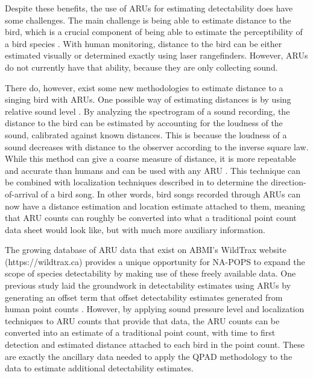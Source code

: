 \par Despite these benefits, the use of ARUs for estimating detectability does have some challenges. 
The main challenge is being able to estimate distance to the bird, which is a crucial component of being able to estimate the perceptibility of a bird species \citep{buckland_distance_2015}.
With human monitoring, distance to the bird can be either estimated visually or determined exactly using laser rangefinders.
However, ARUs do not currently have that ability, because they are only collecting sound. 

\par There do, however, exist some new methodologies to estimate distance to a singing bird with ARUs.
One possible way of estimating distances is by using relative sound level \citep{sebastian-gonzalez_density_2018, yip_sound_2017}.
By analyzing the spectrogram of a sound recording, the distance to the bird can be estimated by accounting for the loudness of the sound, calibrated against known distances.
This is because the loudness of a sound decreases with distance to the observer according to the inverse square law.
While this method can give a coarse measure of distance, it is more repeatable and accurate than humans and can be used with any ARU \citep{yip_sound_2020}.
This technique can be combined with localization techniques described in \cite{hedley_direction--arrival_2017} to determine the direction-of-arrival of a bird song.
In other words, bird songs recorded through ARUs can now have a distance estimation and location estimate attached to them, meaning that ARU counts can roughly be converted into what a traditional point count data sheet would look like, but with much more auxiliary information. 

The growing database of ARU data that exist on ABMI’s WildTrax website (https://wildtrax.ca) provides a unique opportunity for NA-POPS to expand the scope of species detectability by making use of these freely available data.
One previous study laid the groundwork in detectability estimates using ARUs by generating an offset term that offset detectability estimates generated from human point counts \citep{van_wilgenburg_paired_2017}.
However, by applying sound pressure level and localization techniques to ARU counts that provide that data, the ARU counts can be converted into an estimate of a traditional point count, with time to first detection and estimated distance attached to each bird in the point count.
These are exactly the ancillary data needed to apply the QPAD methodology to the data to estimate additional detectability estimates. 


